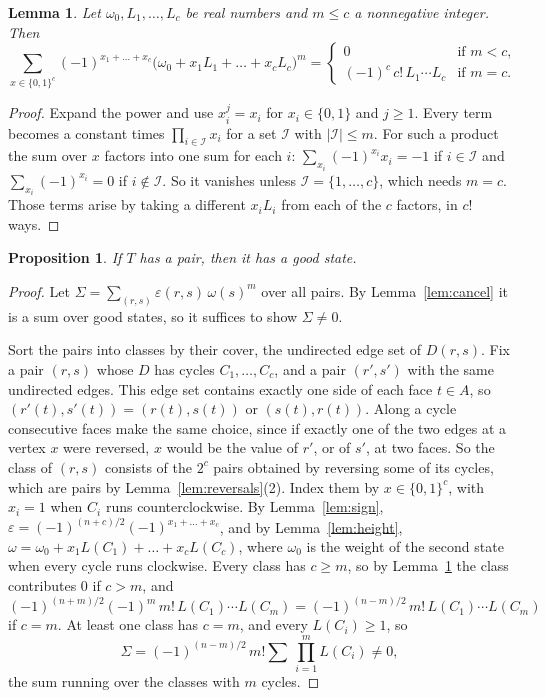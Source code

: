 \documentclass[10pt]{amsart}
\numberwithin{equation}{section}
\newtheorem{proposition}[equation]{Proposition}
\newtheorem{lemma}[equation]{Lemma}
\theoremstyle{definition}
\theoremstyle{remark}
\newcommand{\T}{T}
\newcommand{\eps}{\varepsilon}
\begin{document}
\begin{lemma}\label{lem:difference}
Let $\omega_0,L_1,\dots,L_c$ be real numbers and $m\le c$ a nonnegative integer.
Then
\[
\sum_{x\in\{0,1\}^c}(-1)^{x_1+\dots+x_c}\bigl(\omega_0+x_1L_1+\dots+x_cL_c\bigr)^m
=\begin{cases}0 & \text{if } m<c,\\ (-1)^c\,c!\,L_1\cdots L_c & \text{if } m=c.\end{cases}
\]
\end{lemma}

\begin{proof}
Expand the power and use $x_i^j=x_i$ for $x_i\in\{0,1\}$ and $j\ge1$.
Every term becomes a constant times $\prod_{i\in \mathcal{I}}x_i$ for a set $\mathcal{I}$ with $|\mathcal{I}|\le m$.
For such a product the sum over $x$ factors into one sum for each $i$: $\sum_{x_i}(-1)^{x_i}x_i=-1$ if $i\in \mathcal{I}$ and $\sum_{x_i}(-1)^{x_i}=0$ if $i\notin \mathcal{I}$.
So it vanishes unless $\mathcal{I}=\{1,\dots,c\}$, which needs $m=c$. Those terms arise by taking a different $x_iL_i$ from each of the $c$ factors, in $c!$ ways.
\end{proof}

\begin{proposition}\label{prop:good}
If $\T$ has a pair, then it has a good state.
\end{proposition}

\begin{proof}
Let $\Sigma=\sum_{(r,s)}\eps(r,s)\,\omega(s)^m$ over all pairs.
By Lemma~\ref{lem:cancel} it is a sum over good states, so it suffices to show $\Sigma\neq0$.

Sort the pairs into classes by their cover, the undirected edge set of $D(r,s)$.
Fix a pair $(r,s)$ whose $D$ has cycles $C_1,\dots,C_c$, and a pair $(r',s')$ with the same undirected edges.
This edge set contains exactly one side of each face $t\in A$, so $(r'(t),s'(t))=(r(t),s(t))$ or $(s(t),r(t))$.
Along a cycle consecutive faces make the same choice, since if exactly one of the two edges at a vertex $x$ were reversed, $x$ would be the value of $r'$, or of $s'$, at two faces.
So the class of $(r,s)$ consists of the $2^c$ pairs obtained by reversing some of its cycles, which are pairs by Lemma~\ref{lem:reversals}(2).
Index them by $x\in\{0,1\}^c$, with $x_i=1$ when $C_i$ runs counterclockwise.
By Lemma~\ref{lem:sign}, $\eps=(-1)^{(n+c)/2}(-1)^{x_1+\dots+x_c}$, and by Lemma~\ref{lem:height}, $\omega=\omega_0+x_1L(C_1)+\dots+x_cL(C_c)$, where $\omega_0$ is the weight of the second state when every cycle runs clockwise.
Every class has $c\ge m$, so by Lemma~\ref{lem:difference} the class contributes $0$ if $c>m$, and
\[
(-1)^{(n+m)/2}(-1)^m\,m!\,L(C_1)\cdots L(C_m)=(-1)^{(n-m)/2}\,m!\,L(C_1)\cdots L(C_m)
\]
if $c=m$.
At least one class has $c=m$, and every $L(C_i)\ge1$, so
\[
\Sigma=(-1)^{(n-m)/2}\,m!\sum\ \prod_{i=1}^m L(C_i)\neq0,
\]
the sum running over the classes with $m$ cycles.
\end{proof}
\end{document}
